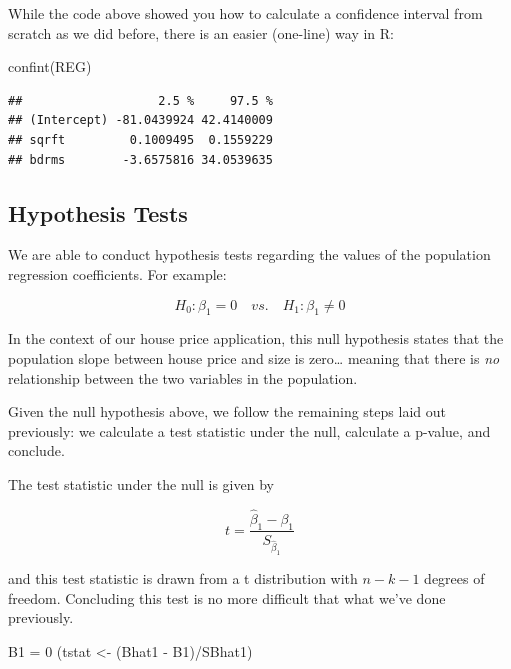 \documentclass[
]{book}
\newenvironment{Shaded}{\begin{snugshade}}{\end{snugshade}}
\newcommand{\DecValTok}[1]{\textcolor[rgb]{0.00,0.00,0.81}{#1}}
\newcommand{\FunctionTok}[1]{\textcolor[rgb]{0.00,0.00,0.00}{#1}}
\newcommand{\NormalTok}[1]{#1}
\newcommand{\OtherTok}[1]{\textcolor[rgb]{0.56,0.35,0.01}{#1}}
\newcommand{\SpecialCharTok}[1]{\textcolor[rgb]{0.00,0.00,0.00}{#1}}
\begin{document}
While the code above showed you how to calculate a confidence interval from scratch as we did before, there is an easier (one-line) way in R:

\begin{Shaded}
\begin{Highlighting}[]
\FunctionTok{confint}\NormalTok{(REG)}
\end{Highlighting}
\end{Shaded}

\begin{verbatim}
##                   2.5 %     97.5 %
## (Intercept) -81.0439924 42.4140009
## sqrft         0.1009495  0.1559229
## bdrms        -3.6575816 34.0539635
\end{verbatim}

\hypertarget{hypothesis-tests-1}{%
\subsection{Hypothesis Tests}\label{hypothesis-tests-1}}

We are able to conduct hypothesis tests regarding the values of the population regression coefficients. For example:

\[H_0:\beta_1 = 0 \quad vs. \quad H_1:\beta_1 \neq 0\]

In the context of our house price application, this null hypothesis states that the population slope between house price and size is zero\ldots{} meaning that there is \emph{no} relationship between the two variables in the population.

Given the null hypothesis above, we follow the remaining steps laid out previously: we calculate a test statistic under the null, calculate a p-value, and conclude.

The test statistic under the null is given by

\[t=\frac{\hat{\beta}_1 - \beta_1}{S_{\hat{\beta}_1}}\]

and this test statistic is drawn from a t distribution with \(n-k-1\) degrees of freedom. Concluding this test is no more difficult that what we've done previously.

\begin{Shaded}
\begin{Highlighting}[]
\NormalTok{B1 }\OtherTok{=} \DecValTok{0}
\NormalTok{(tstat }\OtherTok{\textless{}{-}}\NormalTok{ (Bhat1 }\SpecialCharTok{{-}}\NormalTok{ B1)}\SpecialCharTok{/}\NormalTok{SBhat1)}
\end{Highlighting}
\end{Shaded}
\end{document}
